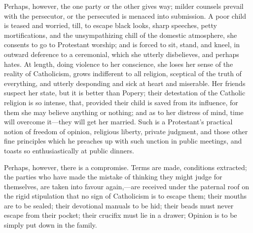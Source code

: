 Perhaps, however, the one party or the other gives
way; milder counsels prevail with the persecutor, or the
persecuted is menaced into submission. A poor child is
teased and worried, till, to escape black looks, sharp
speeches, petty mortifications, and the unsympathizing
chill of the domestic atmosphere, she consents to go to
Protestant worship; and is forced to sit, stand, and
kneel, in outward deference to a ceremonial, which she
utterly disbelieves, and perhaps hates. At length, doing
violence to her conscience, she loses her sense of the
reality of Catholicism, grows indifferent to all
religion, sceptical of the truth of everything, and
utterly desponding and sick at heart and miserable. Her
friends suspect her state, but it is better than Popery;
their detestation of the Catholic religion is so intense,
that, provided their child is saved from its influence,
for them she may believe anything or nothing; and as to
her distress of mind, time will overcome it—they
will get her married. Such is a Protestant's practical
notion of freedom of opinion, religious liberty, private
judgment, and those other fine principles which he
preaches up with such unction in public meetings, and
toasts so enthusiastically at public dinners.

Perhaps, however, there is a compromise. Terms are
made, conditions extracted; the parties who have made the
mistake of thinking they might judge for themselves, are
taken into favour again,—are received under the
paternal roof on the rigid stipulation that no sign of
Catholicism is to escape them; their mouths are to be
sealed; their devotional manuals to be hid; their beads
must never escape from their pocket; their crucifix must
lie in a drawer; Opinion is to be simply put down in the
family.

